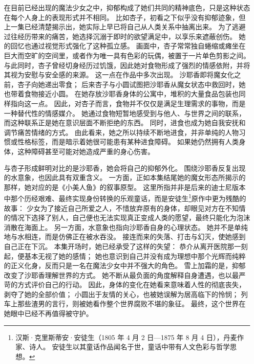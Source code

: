 在目前已经出现的魔法少女之中，抑郁构成了她们共同的精神底色，只是这种状态在每个人身上的表现形式并不相同。
比如杏子，初看之下似乎没有抑郁迹象，但上一集已经清楚揭示出，她实际上早已将自己从人类关系中抽离出来。
为了逃避过往经历带来的痛苦，她选择沉溺于即时的欲望满足中，以享乐来遮蔽创伤。
她的回忆也通过视觉形式强化了这种孤立感。
画面中，杏子常常独自蜷缩或瘫坐在巨大而空旷的空间里，或者作为唯一具有色彩的玩偶，被置于一片单色剪影之间。
与此同时，杏子曾经切身经历过饥饿，因此她对食物形成了强烈的情感依附，并将其视为安慰与安全感的来源。
这一点在作品中多次出现。
沙耶香即将魔女化之前，杏子向她递出零食；
后来杏子与小圆试图把沙耶香从魔女状态中救回时，她也带着食物接近小圆。
在她存放沙耶香身体的公寓中，堆积的大量食品包装也同样指向这一点。
因此，对杏子而言，食物并不仅仅是满足生理需求的事物，而是一种替代性的情感媒介。
她通过食物短暂地感受到与他人、与世界之间的联系，而这种联系正是她在意识层面不断拒绝的东西。
同时，进食也成为她自我安抚和调节痛苦情绪的方式。
由此看来，她之所以持续不断地进食，并非单纯的人物习惯或性格标签，而是暗示着她很可能患有某种进食障碍。
如果她仍然拥有人类身体，这种障碍甚至可能对她造成严重的身心伤害。

与杏子形成鲜明对比的是沙耶香，她会将自己的抑郁外化。
围绕沙耶香反复出现的水意象，也因此具有双重含义。
一方面，正如本集结尾她的魔女形态所揭示的那样，她对应的是《小美人鱼》的叙事原型。
这里所指并非是后来的迪士尼版本中那个历经艰难、最终实现身份转换的乐观童话，而是安徒生\footnote{%
    汉斯·克里斯蒂安·安徒生（1805 年 4 月 2 日—1875 年 8 月 4 日），丹麦作家、诗人。
    安徒生以其童话作品闻名于世，童话中带有人文色彩与哲学思想。
}原作中更为残酷的故事：
少女为了接近自己所爱之人，不惜放弃原有的身体，却眼见对方在不知情的情况下选择了别人，自己便也无法实现真正变成人类的愿望，最终只能化为泡沫消散在海面上\cite{ref45}。
另一方面，水意象也指向沙耶香自身的心理状态。
她并不是单纯地与水相连，而是仿佛正在被水吞没。
接连而来的失落、打击与幻灭，使她感到自己正在下沉。
本集开场时，她已经承受了这样的失望：
恭介从离开医院那一刻起，便基本无视了她的感情；
她也意识到自己并没有成为理想中那个光辉而纯粹的正义化身，反而只是一名在魔法少女中并不强大的角色。
雪上加霜的是，抑郁改变了沙耶香理解世界的方式。
她不断从最负面的角度解释自身遭遇，也以最严苛的方式评价自己的行动。
因此，身体的变化在她看来意味着人性的彻底丧失，剥夺了她的全部价值；
小圆出于友情的关心，也被她误解为居高临下的怜悯；
列车上那些渣男的言行，则被她看作整个世界腐败不堪的象征。
最终，这个世界在她眼中已经不再值得被守护。

